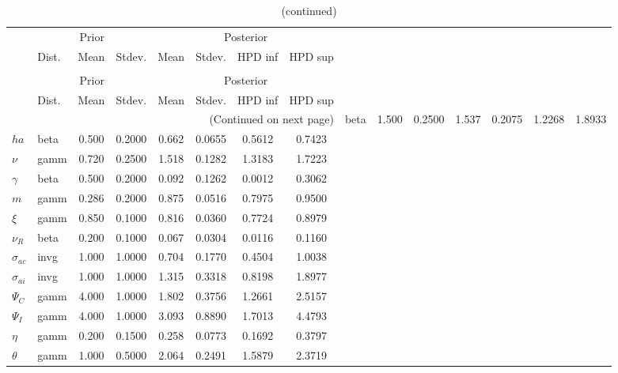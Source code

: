  
\begin{center}
\begin{longtable}{llcccccc} 
\caption{Results from Metropolis-Hastings (parameters)}
 \label{Table:MHPosterior:1}\\
\toprule 
  & \multicolumn{3}{c}{Prior}  &  \multicolumn{4}{c}{Posterior} \\
  \cmidrule(r{.75em}){2-4} \cmidrule(r{.75em}){5-8}
  & Dist. & Mean  & Stdev. & Mean & Stdev. & HPD inf & HPD sup\\
\midrule \endfirsthead 
\caption{(continued)}\\\toprule 
  & \multicolumn{3}{c}{Prior}  &  \multicolumn{4}{c}{Posterior} \\
  \cmidrule(r{.75em}){2-4} \cmidrule(r{.75em}){5-8}
  & Dist. & Mean  & Stdev. & Mean & Stdev. & HPD inf & HPD sup\\
\midrule \endhead 
\bottomrule \multicolumn{8}{r}{(Continued on next page)} \endfoot 
\bottomrule \endlastfoot 
${\sigma}$ & beta &   1.500 & 0.2500 &   1.537& 0.2075 &  1.2268 &  1.8933 \\ 
${ha}$ & beta &   0.500 & 0.2000 &   0.662& 0.0655 &  0.5612 &  0.7423 \\ 
$\nu$ & gamm &   0.720 & 0.2500 &   1.518& 0.1282 &  1.3183 &  1.7223 \\ 
$\gamma$ & beta &   0.500 & 0.2000 &   0.092& 0.1262 &  0.0012 &  0.3062 \\ 
${m}$ & gamm &   0.286 & 0.2000 &   0.875& 0.0516 &  0.7975 &  0.9500 \\ 
$\xi$ & gamm &   0.850 & 0.1000 &   0.816& 0.0360 &  0.7724 &  0.8979 \\ 
${\nu_R}$ & beta &   0.200 & 0.1000 &   0.067& 0.0304 &  0.0116 &  0.1160 \\ 
${\sigma_{ac}}$ & invg &   1.000 & 1.0000 &   0.704& 0.1770 &  0.4504 &  1.0038 \\ 
${\sigma_{ai}}$ & invg &   1.000 & 1.0000 &   1.315& 0.3318 &  0.8198 &  1.8977 \\ 
${\Psi_C}$ & gamm &   4.000 & 1.0000 &   1.802& 0.3756 &  1.2661 &  2.5157 \\ 
${\Psi_I}$ & gamm &   4.000 & 1.0000 &   3.093& 0.8890 &  1.7013 &  4.4793 \\ 
${\eta}$ & gamm &   0.200 & 0.1500 &   0.258& 0.0773 &  0.1692 &  0.3797 \\ 
${\theta}$ & gamm &   1.000 & 0.5000 &   2.064& 0.2491 &  1.5879 &  2.3719 \\ 

\end{longtable}
\end{center}
